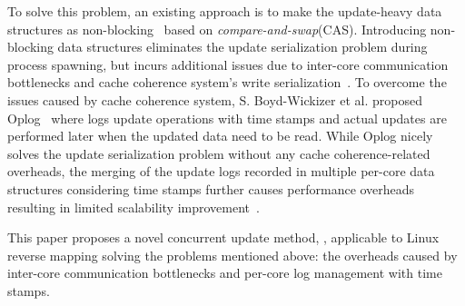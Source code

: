 To solve this problem, an existing approach is to make the update-heavy data
structures as non-blocking~\cite{Harris2001Lockfree} based on \emph{compare-and-swap}(CAS).
Introducing non-blocking data structures eliminates the update serialization problem
during process spawning, but incurs additional issues due to inter-core communication 
bottlenecks and cache coherence system's write serialization~\cite{SilasBoydWickizerPth}.
To overcome the issues caused by cache coherence system, S. Boyd-Wickizer et al. proposed
Oplog~\cite{SilasBoydWickizerPth} where logs update operations with time stamps and 
actual updates are performed later when the updated data need to be read.
While Oplog nicely solves the update serialization problem without any cache coherence-related
overheads, the merging of the update logs recorded in multiple per-core data structures
considering time stamps further causes performance overheads resulting in limited 
scalability improvement~\cite{McKenney2008ParallelProgramming}. 



This paper proposes a novel concurrent update method, , applicable to Linux
reverse mapping solving the problems 
mentioned above: the overheads caused by inter-core communication bottlenecks and
per-core log management with time stamps. 

